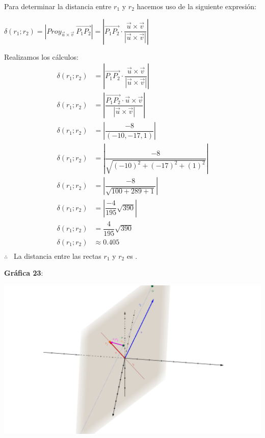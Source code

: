 \noindent Para determinar la distancia entre $r_1$ y $r_2$ hacemos uso de la siguiente expresión:

\begin{center}
	$\boxed{\delta(r_1;r_2)
			= \left |Proy_{\vec{u} \times \vec{v}} \ \overrightarrow{P_1P_2} \right|
			= \left|\overrightarrow{P_1P_2} \cdot \dfrac{\vec{u} \times \vec{v}}{|\vec{u} \times \vec{v}|} \right|}$
\end{center}

\noindent Realizamos los cálculos:
\begin{align*}
	\delta(r_1;r_2) & = \left|\overrightarrow{P_1P_2} \cdot \dfrac{\vec{u} \times \vec{v}}{|\vec{u} \times \vec{v}|} \right| \\
	\delta(r_1;r_2) & = \left|\dfrac{\overrightarrow{P_1P_2} \cdot \vec{u} \times \vec{v}}{|\vec{u} \times \vec{v}|} \right| \\
	\delta(r_1;r_2) & = \left|\dfrac{-8}{(-10, -17, 1)} \right|                                                              \\
	\delta(r_1;r_2) & = \left|\dfrac{-8}{\sqrt{(-10)^2 + (-17)^2 +  (1)^2}} \right|                                          \\
	\delta(r_1;r_2) & = \left|\dfrac{-8}{\sqrt{100 + 289 +  1}} \right|                                                      \\
	\delta(r_1;r_2) & = \left|\dfrac{-4}{195}\sqrt{390} \right|                                                              \\
	\delta(r_1;r_2) & = \dfrac{4}{195}\sqrt{390}                                                                             \\
	\delta(r_1;r_2) & \approx 0.405                                                                                          \\
\end{align*}
$\therefore$ \ La distancia entre las rectas $r_1$ y $r_2$ es .

\newpage
\noindent \textbf{Gráfica 23}:
\begin{center}
	\href{https://www.geogebra.org/3d/ghqqu7e7}{\includegraphics[width=15cm, scale=1]{TP-MATEMATICA-EJ23.png}}
\end{center}
